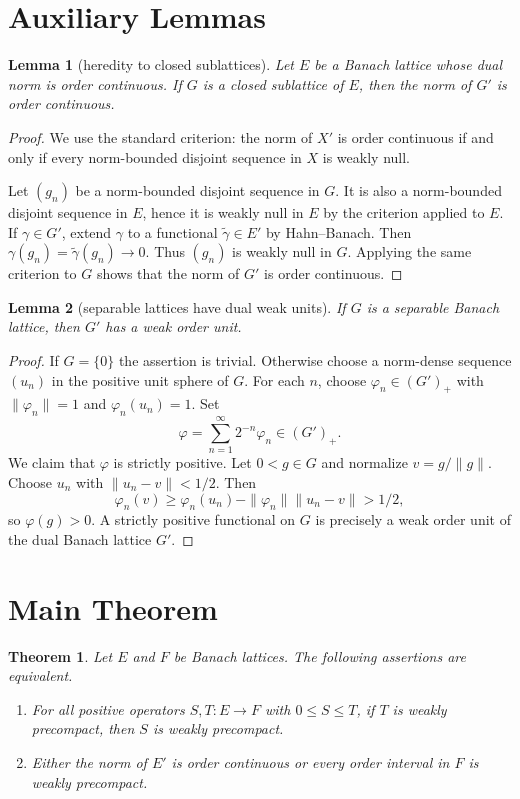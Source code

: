 \documentclass[11pt]{article}
\newtheorem{theorem}{Theorem}
\newtheorem{lemma}{Lemma}
\begin{document}
\section*{Auxiliary Lemmas}

\begin{lemma}[heredity to closed sublattices]
Let $E$ be a Banach lattice whose dual norm is order continuous. If $G$ is a
closed sublattice of $E$, then the norm of $G'$ is order continuous.
\end{lemma}

\begin{proof}
We use the standard criterion: the norm of $X'$ is order continuous if and
only if every norm-bounded disjoint sequence in $X$ is weakly null.

Let $(g_n)$ be a norm-bounded disjoint sequence in $G$. It is also a
norm-bounded disjoint sequence in $E$, hence it is weakly null in $E$ by the
criterion applied to $E$. If $\gamma\in G'$, extend $\gamma$ to a functional
$\widetilde\gamma\in E'$ by Hahn--Banach. Then
$\gamma(g_n)=\widetilde\gamma(g_n)\to0$. Thus $(g_n)$ is weakly null in $G$.
Applying the same criterion to $G$ shows that the norm of $G'$ is order
continuous.
\end{proof}

\begin{lemma}[separable lattices have dual weak units]
If $G$ is a separable Banach lattice, then $G'$ has a weak order unit.
\end{lemma}

\begin{proof}
If $G=\{0\}$ the assertion is trivial. Otherwise choose a norm-dense sequence
$(u_n)$ in the positive unit sphere of $G$. For each $n$, choose
$\varphi_n\in (G')_+$ with $\|\varphi_n\|=1$ and $\varphi_n(u_n)=1$.
Set
\[
  \varphi=\sum_{n=1}^{\infty} 2^{-n}\varphi_n\in (G')_+.
\]
We claim that $\varphi$ is strictly positive. Let $0<g\in G$ and normalize
$v=g/\|g\|$. Choose $u_n$ with $\|u_n-v\|<1/2$. Then
\[
  \varphi_n(v)\geq \varphi_n(u_n)-\|\varphi_n\|\|u_n-v\|>1/2,
\]
so $\varphi(g)>0$. A strictly positive functional on $G$ is precisely a weak
order unit of the dual Banach lattice $G'$.
\end{proof}

\section*{Main Theorem}

\begin{theorem}
Let $E$ and $F$ be Banach lattices. The following assertions are equivalent.
\begin{enumerate}[label=(\arabic*)]
\item For all positive operators $S,T:E\to F$ with $0\leq S\leq T$, if $T$
is weakly precompact, then $S$ is weakly precompact.
\item Either the norm of $E'$ is order continuous or every order interval in
$F$ is weakly precompact.
\end{enumerate}
\end{theorem}
\end{document}
